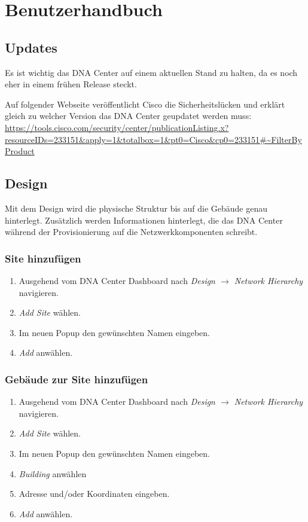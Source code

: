 \section{Benutzerhandbuch}

\subsection{Updates}
Es ist wichtig das DNA Center auf einem aktuellen Stand zu halten, da es noch eher in einem frühen Release steckt.

Auf folgender Webseite veröffentlicht Cisco die Sicherheitslücken und erklärt gleich zu welcher Version das DNA Center geupdatet werden muss:
\url{https://tools.cisco.com/security/center/publicationListing.x?resourceIDs=233151\&apply=1\&totalbox=1\&pt0=Cisco\&cp0=233151\#~FilterByProduct}

\subsection{Design}
Mit dem Design wird die physische Struktur bis auf die Gebäude genau hinterlegt. Zusätzlich werden Informationen hinterlegt, die das DNA Center während der Provisionierung auf die Netzwerkkomponenten schreibt. 

\subsubsection{Site hinzufügen}
\begin{enumerate}
	\item Ausgehend vom DNA Center Dashboard nach \textit{Design $\rightarrow$ Network Hierarchy} navigieren. 
	\item \textit{Add Site} wählen. 
	\item Im neuen Popup den gewünschten Namen eingeben.
	\item \textit{Add} anwählen. 	
\end{enumerate}

\subsubsection{Gebäude zur Site hinzufügen}
\begin{enumerate}
	\item Ausgehend vom DNA Center Dashboard nach \textit{Design $\rightarrow$ Network Hierarchy} navigieren. 
	\item \textit{Add Site} wählen. 
	\item Im neuen Popup den gewünschten Namen eingeben.
	\item \textit{Building} anwählen
	\item Adresse und/oder Koordinaten eingeben.
	\item \textit{Add} anwählen.
\end{enumerate}


